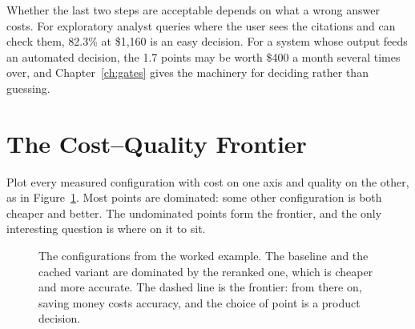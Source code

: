 \documentclass[11pt]{book}
\begin{document}
Whether the last two steps are acceptable depends on what a wrong answer costs. For exploratory analyst queries where the user sees the citations and can check them, 82.3\% at \$1{,}160 is an easy decision. For a system whose output feeds an automated decision, the 1.7 points may be worth \$400 a month several times over, and Chapter~\ref{ch:gates} gives the machinery for deciding rather than guessing.

\section{The Cost--Quality Frontier}

Plot every measured configuration with cost on one axis and quality on the other, as in Figure~\ref{fig:frontier}. Most points are dominated: some other configuration is both cheaper and better. The undominated points form the frontier, and the only interesting question is where on it to sit.

\begin{figure}[htbp]
\centering
{}
\caption{The configurations from the worked example. The baseline and the cached variant are dominated by the reranked one, which is cheaper and more accurate. The dashed line is the frontier: from there on, saving money costs accuracy, and the choice of point is a product decision.}
\label{fig:frontier}
\end{figure}
\end{document}
